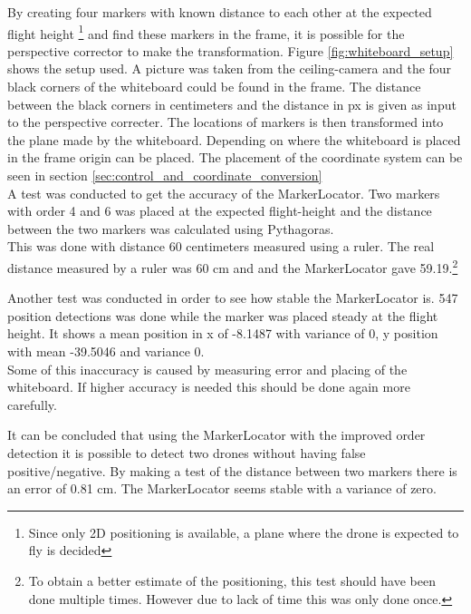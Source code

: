 By creating four markers with known distance to each other at the expected flight height \footnote{Since only 2D positioning is available, a plane where the drone is expected to fly is decided} and find these markers in the frame, it is possible for the perspective corrector to make the transformation.
Figure \ref{fig:whiteboard_setup} shows the setup used. A picture was taken from the ceiling-camera and the four black corners of the whiteboard could be found in the frame. The distance between the black corners in centimeters and the distance in px is given as input to the perspective correcter. The locations of markers is then transformed into the plane made by the whiteboard. Depending on where the whiteboard is placed in the frame origin can be placed. The placement of the coordinate system can be seen in section \ref{sec:control_and_coordinate_conversion}\\


A test was conducted to get the accuracy of the MarkerLocator. Two markers with order 4 and 6 was placed at the expected flight-height and the distance between the two markers was calculated using Pythagoras.\\
This was done with distance 60 centimeters measured using a ruler. 
The real distance measured by a ruler was 60 cm and and the MarkerLocator gave 59.19.\footnote{To obtain a better estimate of the positioning, this test should have been done multiple times. However due to lack of time this was only done once.}

Another test was conducted in order to see how stable the MarkerLocator is. 547 position detections was done while the marker was placed steady at the flight height. It shows a mean position in x of -8.1487 with variance of 0, y position with mean -39.5046 and variance 0. \\

Some of this inaccuracy is caused by measuring error and placing of the whiteboard. If higher accuracy is needed this should be done again more carefully.

It can be concluded that using the MarkerLocator with the improved order detection it is possible to detect two drones without having false positive/negative. By making a test of the distance between two markers there is an error of 0.81 cm. The MarkerLocator seems stable with a variance of zero. 

